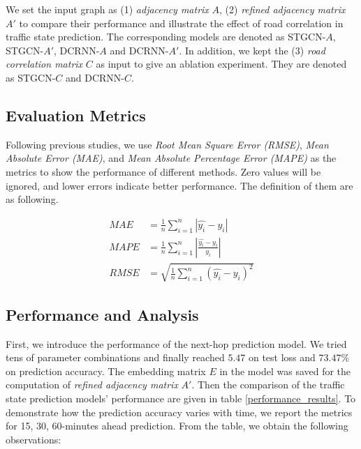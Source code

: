 We set the input graph as (1) \textit{adjacency matrix} $A$, (2) \textit{refined adjacency matrix} $A'$ to compare their performance and illustrate the effect of road correlation in traffic state prediction. The corresponding models are denoted as STGCN-$A$, STGCN-$A'$, DCRNN-$A$ and DCRNN-$A'$. In addition, we kept the (3) \textit{road correlation matrix} $C$ as input to give an ablation experiment. They are denoted as STGCN-$C$ and DCRNN-$C$.

\subsection{Evaluation Metrics}
Following previous studies, we use \textit{Root Mean Square Error (RMSE)}, \textit{Mean Absolute Error (MAE)}, and \textit{Mean Absolute Percentage Error (MAPE)} as the metrics to show the performance of different methods. Zero values will be ignored, and lower errors indicate better performance. The definition of them are as following.

\begin{equation}
    \begin{aligned}
        MAE&=\frac 1n\sum_{i=1}^n|\hat{y_i}-y_i|\\
        MAPE&=\frac 1n\sum_{i=1}^n|\frac{\hat{y_i}-y_i}{y_i}|\\
        RMSE&=\sqrt{\frac 1n\sum_{i=1}^n(\hat{y_i}-y_i)^2}
    \end{aligned}
\end{equation}

\subsection{Performance and Analysis}
First, we introduce the performance of the next-hop prediction model. We tried tens of parameter combinations and finally reached $5.47$ on test loss and $73.47\%$ on prediction accuracy. The embedding matrix $E$ in the model was saved for the computation of \textit{refined adjacency matrix} $A'$. Then the comparison of the traffic state prediction models' performance are given in table \ref{performance_results}. To demonstrate how the prediction accuracy varies with time, we report the metrics for 15, 30, 60-minutes ahead prediction. From the table, we obtain the following observations:

